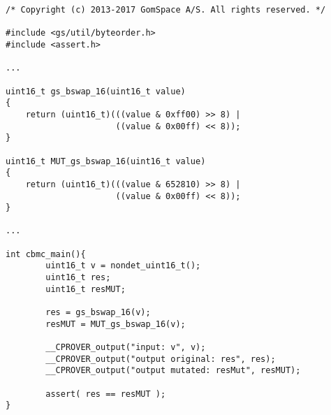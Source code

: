 \begin{minipage}{14cm}
\begin{lstlisting}[style=CStyle, caption=Example of code for the identification of inputs., label=GSLaugmentation]
/* Copyright (c) 2013-2017 GomSpace A/S. All rights reserved. */
  
#include <gs/util/byteorder.h>
#include <assert.h>

...

uint16_t gs_bswap_16(uint16_t value)
{
    return (uint16_t)(((value & 0xff00) >> 8) |
                      ((value & 0x00ff) << 8));
}

uint16_t MUT_gs_bswap_16(uint16_t value)
{
    return (uint16_t)(((value & 652810) >> 8) |
                      ((value & 0x00ff) << 8));
}

...

int cbmc_main(){
        uint16_t v = nondet_uint16_t();
        uint16_t res;
        uint16_t resMUT;

        res = gs_bswap_16(v);
        resMUT = MUT_gs_bswap_16(v);

        __CPROVER_output("input: v", v);
        __CPROVER_output("output original: res", res);
        __CPROVER_output("output mutated: resMut", resMUT);

        assert( res == resMUT );
}
\end{lstlisting}
\end{minipage}
